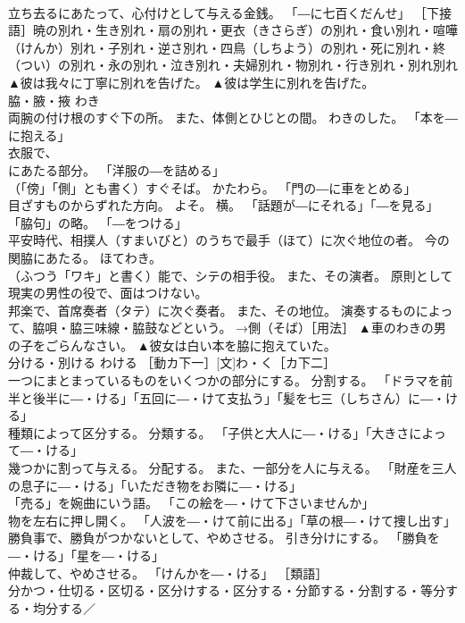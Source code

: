\documentclass[8pt]{extreport}
\begin{document}
\begin{CJK}{UTF8}{min}
\\	立ち去るにあたって、心付けとして与える金銭。 「―に七百くだんせ」 ［下接語］暁の別れ・生き別れ・扇の別れ・更衣（きさらぎ）の別れ・食い別れ・喧嘩（けんか）別れ・子別れ・逆さ別れ・四鳥（しちよう）の別れ・死に別れ・終（つい）の別れ・永の別れ・泣き別れ・夫婦別れ・物別れ・行き別れ・別れ別れ	▲彼は我々に丁寧に別れを告げた。 ▲彼は学生に別れを告げた。
\\	脇・腋・掖	わき	
\\	両腕の付け根のすぐ下の所。 また、体側とひじとの間。 わきのした。 「本を―に抱える」 
\\	衣服で、 
\\	にあたる部分。 「洋服の―を詰める」 
\\	（「傍」「側」とも書く）すぐそば。 かたわら。 「門の―に車をとめる」 
\\	目ざすものからずれた方向。 よそ。 横。 「話題が―にそれる」「―を見る」 
\\	「脇句」の略。 「―をつける」 
\\	平安時代、相撲人（すまいびと）のうちで最手（ほて）に次ぐ地位の者。 今の関脇にあたる。 ほてわき。 
\\	（ふつう「ワキ」と書く）能で、シテの相手役。 また、その演者。 原則として現実の男性の役で、面はつけない。 
\\	邦楽で、首席奏者（タテ）に次ぐ奏者。 また、その地位。 演奏するものによって、脇唄・脇三味線・脇鼓などという。 →側（そば）［用法］	▲車のわきの男の子をごらんなさい。 ▲彼女は白い本を脇に抱えていた。
\\	分ける・別ける	わける	［動カ下一］[文]わ・く［カ下二］ 
\\	一つにまとまっているものをいくつかの部分にする。 分割する。 「ドラマを前半と後半に―・ける」「五回に―・けて支払う」「髪を七三（しちさん）に―・ける」 
\\	種類によって区分する。 分類する。 「子供と大人に―・ける」「大きさによって―・ける」 
\\	幾つかに割って与える。 分配する。 また、一部分を人に与える。 「財産を三人の息子に―・ける」「いただき物をお隣に―・ける」 
\\	「売る」を婉曲にいう語。 「この絵を―・けて下さいませんか」 
\\	物を左右に押し開く。 「人波を―・けて前に出る」「草の根―・けて捜し出す」 
\\	勝負事で、勝負がつかないとして、やめさせる。 引き分けにする。 「勝負を―・ける」「星を―・ける」 
\\	仲裁して、やめさせる。 「けんかを―・ける」 ［類語］
\\	分かつ・仕切る・区切る・区分けする・区分する・分節する・分割する・等分する・均分する／

\end{CJK}
\end{document}
